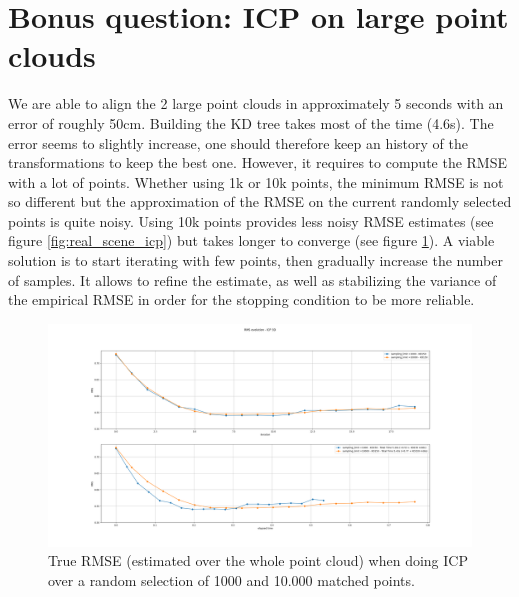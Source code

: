 \documentclass[a4paper]{article}
\begin{document}
\section*{Bonus question: ICP on large point clouds}
We are able to align the 2 large point clouds in approximately 5 seconds with an error of roughly 50cm. Building the KD tree takes most of the time (4.6s). The error seems to slightly increase, one should therefore keep an history of the transformations to keep the best one. However, it requires to compute the RMSE with a lot of points. Whether using 1k or 10k points, the minimum RMSE is not so different but the approximation of the RMSE on the current randomly selected points is quite noisy.
Using 10k points provides less noisy RMSE estimates (see figure \ref{fig:real_scene_icp}) but takes longer to converge (see figure \ref{fig:real_scene_icp_true}). A viable solution is to start iterating with few points, then gradually increase the number of samples. It allows to refine the estimate, as well as stabilizing the variance of the empirical RMSE in order for the stopping condition to be more reliable.

\begin{figure}[H]
  \centering
  \includegraphics[width=1.\linewidth]{figures/RMS_random_sampling_limit_1k_vs_10k.png}
  \caption{True RMSE (estimated over the whole point cloud) when doing ICP over a random selection of 1000 and 10.000 matched points.}
  \label{fig:real_scene_icp_true}
\end{figure}

\end{document}
